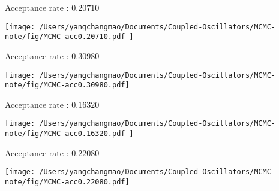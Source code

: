 \documentclass[
]{article}
\begin{document}
Acceptance rate : \(0.20710\)

\texttt{[image: /Users/yangchangmao/Documents/Coupled-Oscillators/MCMC-note/fig/MCMC-acc0.20710.pdf ]}

Acceptance rate : \(0.30980\)

\texttt{[image: /Users/yangchangmao/Documents/Coupled-Oscillators/MCMC-note/fig/MCMC-acc0.30980.pdf]}

Acceptance rate : \(0.16320\)

\texttt{[image: /Users/yangchangmao/Documents/Coupled-Oscillators/MCMC-note/fig/MCMC-acc0.16320.pdf ]}

Acceptance rate : \(0.22080\)

\texttt{[image: /Users/yangchangmao/Documents/Coupled-Oscillators/MCMC-note/fig/MCMC-acc0.22080.pdf]}
\end{document}
